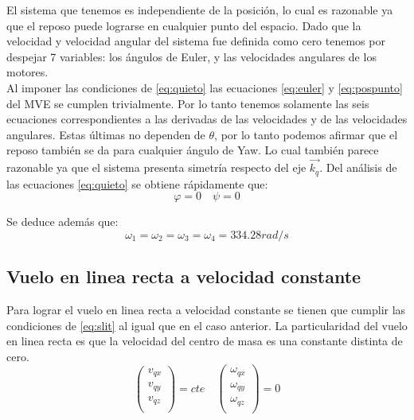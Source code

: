 \documentclass[main]{subfiles}
\begin{document}
El sistema que tenemos es independiente de la posici\'on, lo cual es razonable ya que el reposo puede lograrse en cualquier punto del espacio. Dado que la velocidad y velocidad angular del sistema fue definida como cero tenemos por despejar 7 variables: los \'angulos de Euler, y las velocidades angulares de los motores. \\

Al imponer las condiciones de \ref{eq:quieto} las ecuaciones \ref{eq:euler} y \ref{eq:pospunto} del MVE se cumplen trivialmente. Por lo tanto tenemos solamente las seis ecuaciones correspondientes a las derivadas de las velocidades y de las velocidades angulares. Estas \'ultimas  no dependen de $\theta$, por lo tanto podemos afirmar que el reposo tambi\'en se da para cualquier \'angulo de Yaw. Lo cual tambi\'en parece razonable ya que el sistema presenta simetr\'ia respecto del eje $\vec{k_q}$.
Del an\'alisis de las ecuaciones \ref{eq:quieto} se obtiene r\'apidamente que:
\begin{equation}
\varphi=0 \quad \psi=0
\end{equation}

Se deduce adem\'as que:
\begin{equation}
\omega_1=\omega_2=\omega_3=\omega_4=334.28 rad/s
\end{equation}

\subsection{Vuelo en linea recta a velocidad constante}

Para lograr el vuelo en linea recta a velocidad constante se tienen que cumplir las condiciones de \ref{eq:slit} al igual que en el caso anterior. La particularidad del vuelo en linea recta es que la velocidad del centro de masa es una constante distinta de cero. 
\begin{equation}
\label{eq:recta}
\left(\begin{array}{c}
v_{qx}\\
v_{qy}\\
v_{qz}\\
\end{array}\right)=cte \quad
\left(\begin{array}{c}
\omega_{qx}\\
\omega_{qy}\\
\omega_{qz}\\
\end{array}\right)=0
\end{equation}
\end{document}
